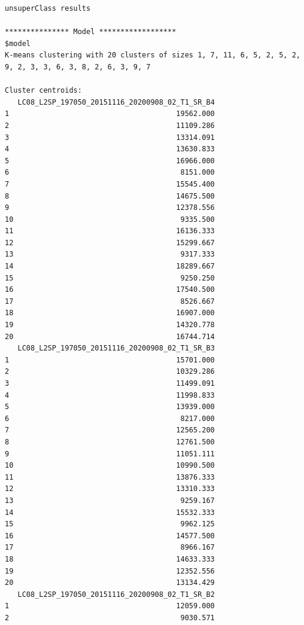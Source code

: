 \documentclass[12pt,a4paper,oneside]{article}
\begin{document}
\begin{scriptsize}
\begin{verbatim}
unsuperClass results

*************** Model ******************
$model
K-means clustering with 20 clusters of sizes 1, 7, 11, 6, 5, 2, 5, 2, 9, 2, 3, 3, 6, 3, 8, 2, 6, 3, 9, 7

Cluster centroids:
   LC08_L2SP_197050_20151116_20200908_02_T1_SR_B4
1                                       19562.000
2                                       11109.286
3                                       13314.091
4                                       13630.833
5                                       16966.000
6                                        8151.000
7                                       15545.400
8                                       14675.500
9                                       12378.556
10                                       9335.500
11                                      16136.333
12                                      15299.667
13                                       9317.333
14                                      18289.667
15                                       9250.250
16                                      17540.500
17                                       8526.667
18                                      16907.000
19                                      14320.778
20                                      16744.714
   LC08_L2SP_197050_20151116_20200908_02_T1_SR_B3
1                                       15701.000
2                                       10329.286
3                                       11499.091
4                                       11998.833
5                                       13939.000
6                                        8217.000
7                                       12565.200
8                                       12761.500
9                                       11051.111
10                                      10990.500
11                                      13876.333
12                                      13310.333
13                                       9259.167
14                                      15532.333
15                                       9962.125
16                                      14577.500
17                                       8966.167
18                                      14633.333
19                                      12352.556
20                                      13134.429
   LC08_L2SP_197050_20151116_20200908_02_T1_SR_B2
1                                       12059.000
2                                        9030.571

\end{verbatim}
\end{scriptsize}
\end{document}
